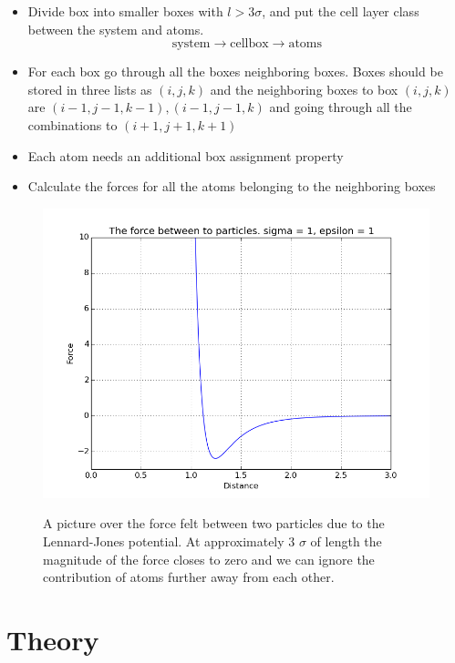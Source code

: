 \documentclass[11pt]{article}
\begin{document}
	\begin{itemize}
		\item Divide box into smaller boxes with \(l >3\sigma\), and put the cell layer class between the system and atoms.
				\[\text{system} \rightarrow\text{cellbox} \rightarrow \text{atoms}\]
		\item For each box go through all the boxes neighboring boxes. Boxes should be stored in three lists as \((i,j,k)\) and the neighboring boxes to box \((i,j,k)\) are \( (i-1, j-1, k-1), (i-1,j-1,k) \) and going through all the combinations to \( (i+1,j+1,k+1) \)
		\item Each atom needs an additional box assignment property
		\item Calculate the forces for all the atoms belonging to the neighboring boxes
	\end{itemize}

	



	\begin{figure}
		\includegraphics[scale = 0.5]{forcePlot}
		\label{fig:force}
		\caption{A picture over the force felt between two particles due to the Lennard-Jones potential. At approximately 3 \(\sigma\) of length the magnitude of the force closes to zero and we can ignore the contribution of atoms further away from each other.}
	\end{figure}



\section{Theory}
\end{document}

